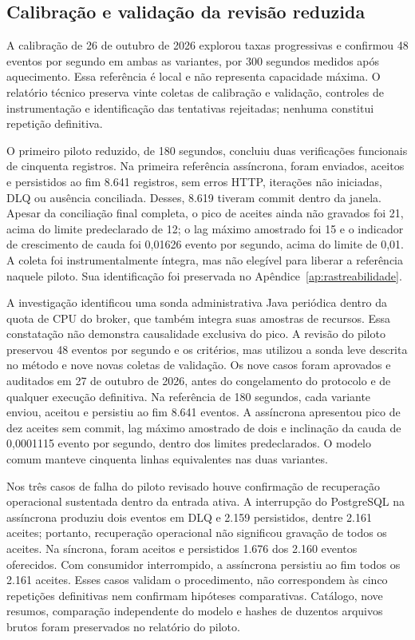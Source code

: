 \subsection{Calibração e validação da revisão reduzida}

A calibração de 26 de outubro de 2026 explorou taxas progressivas e confirmou 48 eventos por segundo em ambas as variantes, por 300 segundos medidos após aquecimento. Essa referência é local e não representa capacidade máxima. O relatório técnico preserva vinte coletas de calibração e validação, controles de instrumentação e identificação das tentativas rejeitadas; nenhuma constitui repetição definitiva.

O primeiro piloto reduzido, de 180 segundos, concluiu duas verificações funcionais de cinquenta registros. Na primeira referência assíncrona, foram enviados, aceitos e persistidos ao fim 8.641 registros, sem erros HTTP, iterações não iniciadas, DLQ ou ausência conciliada. Desses, 8.619 tiveram commit dentro da janela. Apesar da conciliação final completa, o pico de aceites ainda não gravados foi 21, acima do limite predeclarado de 12; o lag máximo amostrado foi 15 e o indicador de crescimento de cauda foi 0,01626 evento por segundo, acima do limite de 0,01. A coleta foi instrumentalmente íntegra, mas não elegível para liberar a referência naquele piloto. Sua identificação foi preservada no Apêndice~\ref{ap:rastreabilidade}.

A investigação identificou uma sonda administrativa Java periódica dentro da quota de CPU do broker, que também integra suas amostras de recursos. Essa constatação não demonstra causalidade exclusiva do pico. A revisão do piloto preservou 48 eventos por segundo e os critérios, mas utilizou a sonda leve descrita no método e nove novas coletas de validação. Os nove casos foram aprovados e auditados em 27 de outubro de 2026, antes do congelamento do protocolo e de qualquer execução definitiva. Na referência de 180 segundos, cada variante enviou, aceitou e persistiu ao fim 8.641 eventos. A assíncrona apresentou pico de dez aceites sem commit, lag máximo amostrado de dois e inclinação da cauda de 0,0001115 evento por segundo, dentro dos limites predeclarados. O modelo comum manteve cinquenta linhas equivalentes nas duas variantes.

Nos três casos de falha do piloto revisado houve confirmação de recuperação operacional sustentada dentro da entrada ativa. A interrupção do PostgreSQL na assíncrona produziu dois eventos em DLQ e 2.159 persistidos, dentre 2.161 aceites; portanto, recuperação operacional não significou gravação de todos os aceites. Na síncrona, foram aceitos e persistidos 1.676 dos 2.160 eventos oferecidos. Com consumidor interrompido, a assíncrona persistiu ao fim todos os 2.161 aceites. Esses casos validam o procedimento, não correspondem às cinco repetições definitivas nem confirmam hipóteses comparativas. Catálogo, nove resumos, comparação independente do modelo e hashes de duzentos arquivos brutos foram preservados no relatório do piloto.

